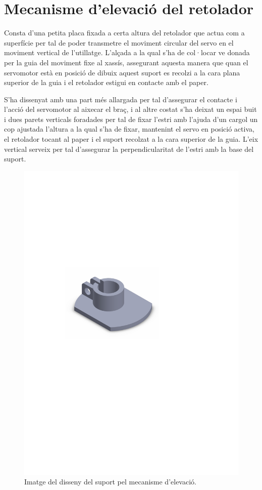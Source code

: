\section{Mecanisme d'elevació del retolador} \label{sec:suportmobil}

Consta d’una petita placa fixada a certa altura del retolador que actua com a superfície per tal de poder transmetre el moviment circular del servo en el moviment vertical de l’utillatge. L’alçada a la qual s’ha de col·locar ve donada per la guia del moviment fixe al xassís, assegurant aquesta manera que quan el servomotor està en posició de dibuix aquest suport es recolzi a la cara plana superior de la guia i el retolador estigui en contacte amb el paper. 

S’ha dissenyat amb una part més allargada per tal d’assegurar el contacte i l’acció del servomotor al aixecar el braç, i al altre costat s’ha deixat un espai buit i dues parets verticals foradades per tal de fixar l’estri amb l’ajuda d’un cargol un cop ajustada l'altura a la qual s'ha de fixar, mantenint el servo en posició activa, el retolador tocant al paper i el suport recolzat a la cara superior de la guia. L’eix vertical serveix per tal d’assegurar la perpendicularitat de l’estri amb la base del suport. 

\begin{figure}[H]
	\centering
	\includegraphics{suport}
	\caption{Imatge del disseny del suport pel mecanisme d'elevació.}
	\label{fig:suport}
\end{figure}

